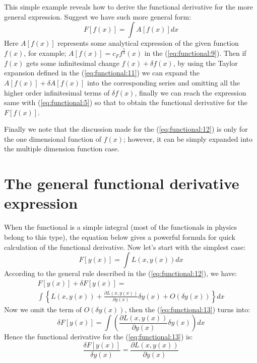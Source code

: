 This simple example reveals how to derive the functional derivative
for the more general expression. Suggest we have such more general
form:
\begin{equation}
  \label{eq:functional:12}
  F[f(x)] = \int A[f(x)] dx
\end{equation}
Here $A[f(x)]$ represents some analytical expression of the given
function $f(x)$, for example; $A[f(x)] = c_{F}f^{\frac{5}{3}}(x)$ in
the (\ref{eq:functional:9}). Then if $f(x)$ gets some infinitesimal
change $f(x) + \delta f(x)$, by using the Taylor expansion defined in
the (\ref{eq:functional:11}) we can expand the $A[f(x)] + \delta A[
f(x)]$
into the corresponding series and omitting all the higher order
infinitesimal terms of $\delta f(x)$, finally we can reach the
expression same with (\ref{eq:functional:5}) so that to obtain the
functional derivative for the $F[f(x)]$.

Finally we note that the discussion made for the
(\ref{eq:functional:12}) is only for the one dimensional function of
$f(x)$; however, it can be simply expanded into the multiple dimension
function case.

\section{The general functional derivative expression}
%
%
%
%
%
When the functional is a simple integral (most of the functionals in
physics belong to this type), the equation below gives a powerful
formula for quick calculation of the functional derivative. Now let's
start with the simplest case:
\begin{equation}
  F[y(x)] = \int L(x, y(x)) dx
\end{equation}
According to the general rule described in the
(\ref{eq:functional:12}), we have:
\begin{multline}
  \label{eq:functional:13}
  F[y(x)] + \delta F[ y(x)] =  \\
  \int \left\{ L(x, y(x)) + \frac{\partial L(x, y(x))}{\partial y(x)}
    \delta y(x) + O(\delta y(x))\right\} dx
\end{multline}
Now we omit the term of $O(\delta y(x))$, then the
(\ref{eq:functional:13}) turns into:
\begin{equation}
  \label{eq:functional:14}
  \delta F[ y(x)] = \int \left(\frac{\partial
      L(x, y(x))}{\partial y(x)} \delta y(x)\right) dx
\end{equation}
Hence the functional derivative for the (\ref{eq:functional:13}) is:
\begin{equation}
  \label{eq:functional:15}
  \frac{\delta  F[y(x)]}{\delta y(x)} =  \frac{\partial
    L(x, y(x))}{\partial y(x)} 
\end{equation}


